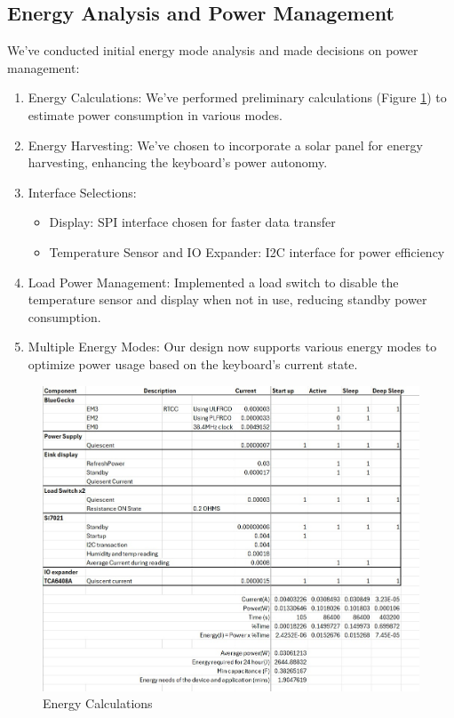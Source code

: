 \documentclass[a4paper,11pt]{article}%
\begin{document}
\subsection{Energy Analysis and Power Management}

We've conducted initial energy mode analysis and made decisions on power management:

\begin{enumerate}
    \item Energy Calculations: We've performed preliminary calculations (Figure \ref{fig:energy_calc}) to estimate power consumption in various modes.

    \item Energy Harvesting: We've chosen to incorporate a solar panel for energy harvesting, enhancing the keyboard's power autonomy.

    \item Interface Selections:
    \begin{itemize}
        \item Display: SPI interface chosen for faster data transfer
        \item Temperature Sensor and IO Expander: I2C interface for power efficiency
    \end{itemize}

    \item Load Power Management: Implemented a load switch to disable the temperature sensor and display when not in use, reducing standby power consumption.

    \item Multiple Energy Modes: Our design now supports various energy modes to optimize power usage based on the keyboard's current state.
\end{enumerate}

\begin{figure}[H]
    \centering
    \includegraphics[scale=0.63]{figures/calc.jpeg}
    \caption{Energy Calculations}
    \label{fig:energy_calc}
\end{figure}
\end{document}
